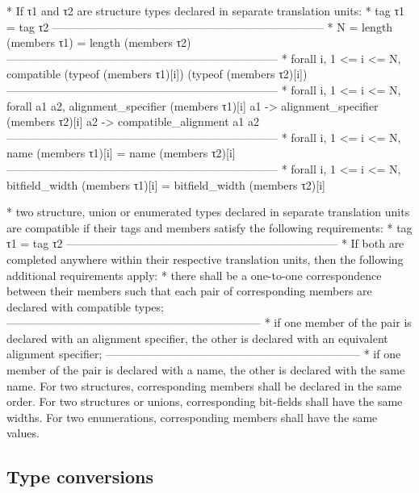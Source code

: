 \documentclass[12pt, a4paper]{article}
\begin{document}
    
    * If τ1 and τ2 are structure types declared in separate translation units:
        * tag τ1 = tag τ2
        ------------------------------------------------------------------------
        * N = length (members τ1) = length (members τ2)
        ------------------------------------------------------------------------
        * forall i, 1 <= i <= N, compatible (typeof (members τ1)[i])
                                            (typeof (members τ2)[i])
        ------------------------------------------------------------------------
        * forall i, 1 <= i <= N,
            forall a1 a2,
              alignment\_specifier (members τ1)[i] a1 ->
              alignment\_specifier (members τ2)[i] a2 ->
              compatible\_alignment a1 a2
        ------------------------------------------------------------------------
        * forall i, 1 <= i <= N, name (members τ1)[i] = name (members τ2)[i]
        ------------------------------------------------------------------------
        * forall i, 1 <= i <= N, bitfield\_width (members τ1)[i] =
                                 bitfield\_width (members τ2)[i]
        



    * two structure, union or enumerated types declared in separate translation
      units are compatible if their tags and members satisfy the following
      requirements:
        * tag τ1 = tag τ2
        ------------------------------------------------------------------------
        * If both are completed anywhere within their respective translation
          units, then the following additional requirements apply:
            * there shall be a one-to-one correspondence between their members
              such that each pair of corresponding members are declared with
              compatible types;
            --------------------------------------------------------------------
            * if one member of the pair is declared with an alignment specifier,
              the other is declared with an equivalent alignment specifier;
            --------------------------------------------------------------------
            * if one member of the pair is declared with a name, the other is
              declared with the same name. For two structures, corresponding
              members shall be declared in the same order. For two structures or unions, corresponding bit-fields shall have the same widths. For two enumerations, corresponding members shall have the same values.


\subsection{Type conversions}
\end{document}
